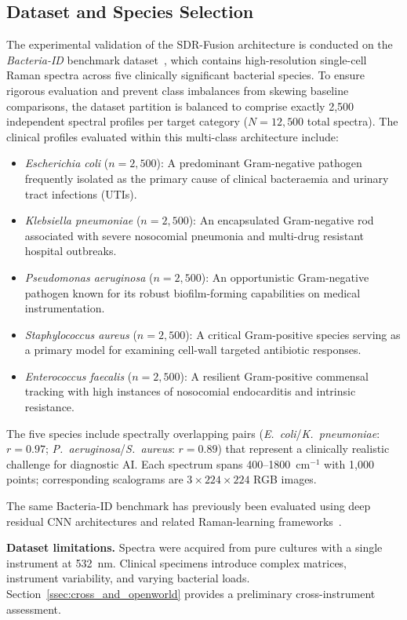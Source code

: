 \documentclass[preprint,12pt]{elsarticle}
\begin{document}
\subsection{Dataset and Species Selection}
\label{ssec:dataset}
The experimental validation of the SDR-Fusion architecture is conducted on the \textit{Bacteria-ID} benchmark dataset~\cite{ho2019rapid}, which contains high-resolution single-cell Raman spectra across five clinically significant bacterial species. To ensure rigorous evaluation and prevent class imbalances from skewing baseline comparisons, the dataset partition is balanced to comprise exactly 2,500 independent spectral profiles per target category ($N = 12,500$ total spectra). The clinical profiles evaluated within this multi-class architecture include:
\begin{itemize}
    \item \textit{Escherichia coli} ($n=2,500$): A predominant Gram-negative pathogen frequently isolated as the primary cause of clinical bacteraemia and urinary tract infections (UTIs).
    \item \textit{Klebsiella pneumoniae} ($n=2,500$): An encapsulated Gram-negative rod associated with severe nosocomial pneumonia and multi-drug resistant hospital outbreaks.
    \item \textit{Pseudomonas aeruginosa} ($n=2,500$): An opportunistic Gram-negative pathogen known for its robust biofilm-forming capabilities on medical instrumentation.
    \item \textit{Staphylococcus aureus} ($n=2,500$): A critical Gram-positive species serving as a primary model for examining cell-wall targeted antibiotic responses.
    \item \textit{Enterococcus faecalis} ($n=2,500$): A resilient Gram-positive commensal tracking with high instances of nosocomial endocarditis and intrinsic resistance.
\end{itemize}
The five species include spectrally overlapping pairs
(\textit{E.~coli}/\textit{K.~pneumoniae}: $r{=}0.97$;
\textit{P.~aeruginosa}/\textit{S.~aureus}: $r{=}0.89$) that represent
a clinically realistic challenge for diagnostic AI. Each spectrum spans
400--1800~cm$^{-1}$ with 1,000 points; corresponding scalograms are
$3\times224\times224$ RGB images.

The same Bacteria-ID benchmark has previously been evaluated using
deep residual CNN architectures and related Raman-learning
frameworks~\cite{ho2019rapid,zhou2022ramannet}.

\textbf{Dataset limitations.} Spectra were acquired from pure cultures
with a single instrument at 532~nm. Clinical specimens introduce
complex matrices, instrument variability, and varying bacterial loads.
Section~\ref{ssec:cross_and_openworld} provides a preliminary
cross-instrument assessment.
\end{document}
